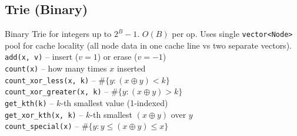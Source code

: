 \subsection{Trie (Binary)}
Binary Trie for integers up to $2^{B}-1$. $O(B)$ per op. Uses single \texttt{vector<Node>} pool for cache locality (all node data in one cache line vs two separate vectors).
\texttt{add(x, v)} -- insert ($v=1$) or erase ($v=-1$)\\
\texttt{count(x)} -- how many times $x$ inserted\\
\texttt{count\_xor\_less(x, k)} -- $\#\{y : (x \oplus y) < k\}$\\
\texttt{count\_xor\_greater(x, k)} -- $\#\{y : (x \oplus y) > k\}$\\
\texttt{get\_kth(k)} -- $k$-th smallest value (1-indexed)\\
\texttt{get\_xor\_kth(x, k)} -- $k$-th smallest $(x \oplus y)$ over $y$\\
\texttt{count\_special(x)} -- $\#\{y : y \le (x \oplus y) \le x\}$
